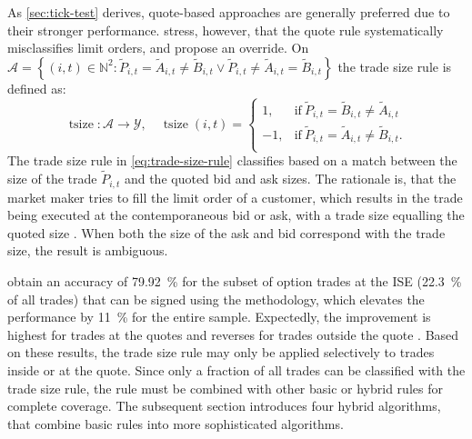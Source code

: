 As \cref{sec:tick-test} derives, quote-based approaches are generally preferred due to their stronger performance. \textcite[][13]{grauerOptionTradeClassification2022} stress, however, that the quote rule systematically misclassifies limit orders, and propose an override. On $\mathcal{A} = \left\{(i, t) \in \mathbb{N}^2: \tilde{P}_{i,t} = \tilde{A}_{i,t} \neq \tilde{B}_{i,t} \lor \tilde{P}_{i,t} \neq\tilde{A}_{i,t} = \tilde{B}_{i,t} \right\}$ the trade size rule is defined as:
\begin{equation}
    \operatorname{tsize} \colon \mathcal{A} \to \mathcal{Y},\quad
    \operatorname{tsize}(i, t)=
    \begin{cases}
        1,  & \mathrm{if}\ \tilde{P}_{i, t} = \tilde{B}_{i, t} \neq \tilde{A}_{i, t}  \\
        -1, & \mathrm{if}\ \tilde{P}_{i, t} = \tilde{A}_{i, t} \neq \tilde{B}_{i, t}. \\
    \end{cases}
    \label{eq:trade-size-rule}
\end{equation}
The trade size rule in \cref{eq:trade-size-rule} classifies based on a match between the size of the trade $\tilde{P}_{i, t}$ and the quoted bid and ask sizes. The rationale is, that the market maker tries to fill the limit order of a customer, which results in the trade being executed at the contemporaneous bid or ask, with a trade size equalling the quoted size \autocite[][13]{grauerOptionTradeClassification2022}. When both the size of the ask and bid correspond with the trade size, the result is ambiguous.

\textcite[][13]{grauerOptionTradeClassification2022} obtain an accuracy of \SI{79.92}{\percent} for the subset of option trades at the \gls{ISE} (\SI{22.3}{\percent} of all trades) that can be signed using the methodology, which elevates the performance by \SI{11}{\percent} for the entire sample. Expectedly, the improvement is highest for trades at the quotes and reverses for trades outside the quote \autocite[][15]{grauerOptionTradeClassification2022}. Based on these results, the trade size rule may only be applied selectively to trades inside or at the quote. Since only a fraction of all trades can be classified with the trade size rule, the rule must be combined with other basic or hybrid rules for complete coverage. The subsequent section introduces four hybrid algorithms, that combine basic rules into more sophisticated algorithms.

